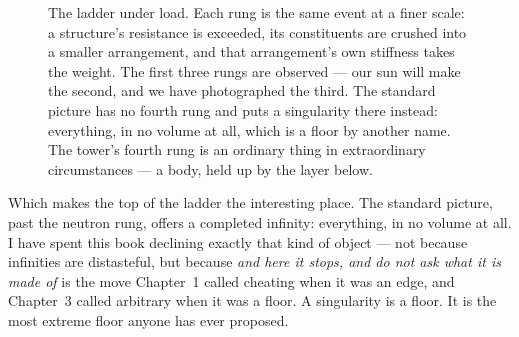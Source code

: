 \begin{figure}[htbp]
\centering
{}
\caption{The ladder under load. Each rung is the same event at a finer scale: a structure's resistance is exceeded, its constituents are crushed into a smaller arrangement, and that arrangement's own stiffness takes the weight. The first three rungs are observed --- our sun will make the second, and we have photographed the third. The standard picture has no fourth rung and puts a singularity there instead: everything, in no volume at all, which is a floor by another name. The tower's fourth rung is an ordinary thing in extraordinary circumstances --- a body, held up by the layer below.}
\label{fig:collapseladder}
\end{figure}

Which makes the top of the ladder the interesting place. The standard picture, past the neutron rung, offers a completed infinity: everything, in no volume at all. I have spent this book declining exactly that kind of object --- not because infinities are distasteful, but because \emph{and here it stops, and do not ask what it is made of} is the move Chapter~1 called cheating when it was an edge, and Chapter~3 called arbitrary when it was a floor. A singularity is a floor. It is the most extreme floor anyone has ever proposed.

